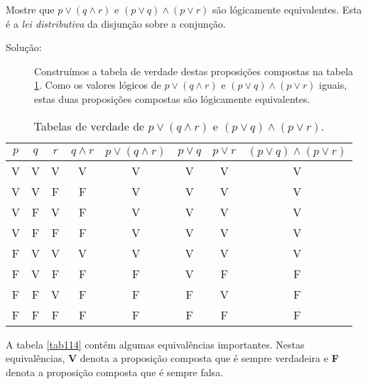 \label{exem123}
\begin{exmp}
Mostre que $p \lor (q \land r)$ e $(p \lor q) \land (p \lor r)$ são lógicamente
equivalentes. Esta é a \emph{lei distributiva} da disjunção sobre a conjunção.
\end{exmp}

\begin{description}
\item[Solução:] Construímos a tabela de verdade destas proposições compostas na
tabela \ref{tab113}. Como os valores lógicos de $p \lor (q \land r)$ e $(p
\lor q) \land (p \lor r)$ iguais, estas duas proposições compostas são
lógicamente equivalentes.
\end{description}

\begin{table}[H]
	\centering
	\begin{tabular}{|c|c|c|c|c|c|c|c|}%
	\toprule
	\textbf{$p$} & \textbf{$q$} & \textbf{$r$} & \textbf{$q \land r$} &
	\textbf{$p \lor (q \land r)$} & \textbf{$p \lor q$} & \textbf{$p \lor r$} &
	\textbf{$(p \lor q) \land (p \lor r)$}\\
	\midrule
	V & V & V & V & V & V & V & V\\
	V & V & F & F & V & V & V & V\\
	V & F & V & F & V & V & V & V\\
	V & F & F & F & V & V & V & V\\
	F & V & V & V & V & V & V & V\\
	F & V & F & F & F & V & F & F\\
	F & F & V & F & F & F & V & F\\
	F & F & F & F & F & F & F & F\\
	\bottomrule%
	\end{tabular}%
	\caption{Tabelas de verdade de $p \lor (q \land r)$ e $(p \lor q) \land (p \lor
	r)$.}
	\label{tab113}
\end{table}
A tabela \ref{tab114} contém algumas equivalências importantes. Nestas
equivalências, \textbf{V} denota a proposição composta que é sempre verdadeira e
\textbf{F} denota a proposição composta que é sempre falsa.

